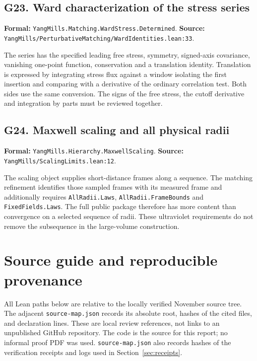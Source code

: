 \documentclass[11pt]{article}
\newcommand{\code}[1]{{\small\nolinkurl{#1}}}
\begin{document}
\subsection*{G23. Ward characterization of the stress series}
\label{gloss:G23}
\textbf{Formal:} \code{YangMills.Matching.WardStress.Determined}.\newline
\textbf{Source:} \code{YangMills/PerturbativeMatching/WardIdentities.lean:33}.

The series has the specified leading free stress, symmetry,
signed-axis covariance, vanishing one-point function, conservation
and a translation identity. Translation is expressed by integrating
stress flux against a window isolating the first insertion and
comparing with a derivative of the ordinary correlation test.
Both sides use the same conversion. The signs of the free stress,
the cutoff derivative and integration by parts must be reviewed
together.

\subsection*{G24. Maxwell scaling and all physical radii}
\label{gloss:G24}
\textbf{Formal:} \code{YangMills.Hierarchy.MaxwellScaling}.\newline
\textbf{Source:} \code{YangMills/ScalingLimits.lean:12}.

The scaling object supplies short-distance frames along a
sequence. The matching refinement identifies those sampled frames
with its measured frame and additionally requires
\code{AllRadii.Laws}, \code{AllRadii.FrameBounds} and
\code{FixedFields.Laws}. The full public package therefore has
more content than convergence on a selected sequence of radii.
These ultraviolet requirements do not remove the subsequence
in the large-volume construction.




\clearpage
\section{Source guide and reproducible provenance}

All Lean paths below are relative to the locally verified November
source tree. The adjacent \code{source-map.json} records its absolute
root, hashes of the cited files, and declaration lines. These are
local review references, not links to an unpublished GitHub repository.
The code is the source for this report; no informal proof PDF was used.
\code{source-map.json} also records hashes of the verification receipts
and logs used in Section~\ref{sec:receipts}.
\end{document}

